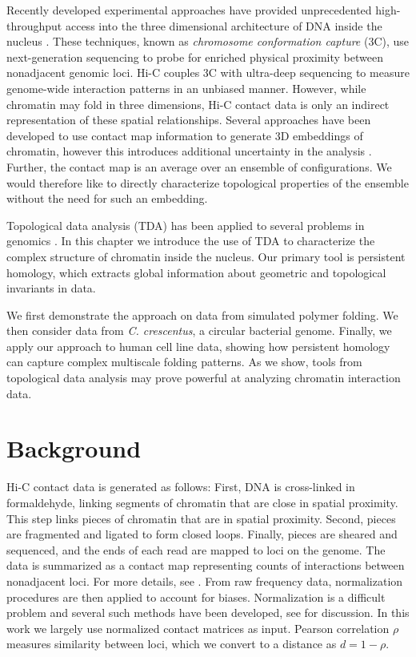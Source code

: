 Recently developed experimental approaches have provided unprecedented high-throughput access into the three dimensional architecture of DNA inside the nucleus \cite{LiebermanAiden:2009jz,Dekker:2013hi,Ay:2015gv}.
These techniques, known as \emph{chromosome conformation capture} (3C), use next-generation sequencing to probe for enriched physical proximity between nonadjacent genomic loci.
Hi-C couples 3C with ultra-deep sequencing to measure genome-wide interaction patterns in an unbiased manner.
However, while chromatin may fold in three dimensions, Hi-C contact data is only an indirect representation of these spatial relationships.
Several approaches have been developed to use contact map information to generate 3D embeddings of chromatin, however this introduces additional uncertainty in the analysis \cite{Ay:2015gv}.
Further, the contact map is an average over an ensemble of configurations.
We would therefore like to directly characterize topological properties of the ensemble without the need for such an embedding.

Topological data analysis (TDA) has been applied to several problems in genomics \cite{Chan:2013,Emmett:2014a}.
In this chapter we introduce the use of TDA to characterize the complex structure of chromatin inside the nucleus.
Our primary tool is persistent homology, which extracts global information about geometric and topological invariants in data.

We first demonstrate the approach on data from simulated polymer folding.
We then consider data from \emph{C. crescentus}, a circular bacterial genome.
Finally, we apply our approach to human cell line data, showing how persistent homology can capture complex multiscale folding patterns.
As we show, tools from topological data analysis may prove powerful at analyzing chromatin interaction data.

\section{Background}
\label{chromatin:sec:background}
%
Hi-C contact data is generated as follows:
First, DNA is cross-linked in formaldehyde, linking segments of chromatin that are close in spatial proximity.
This step links pieces of chromatin that are in spatial proximity.
Second, pieces are fragmented and ligated to form closed loops.
Finally, pieces are sheared and sequenced, and the ends of each read are mapped to loci on the genome.
The data is summarized as a contact map representing counts of interactions between nonadjacent loci.
For more details, see \cite{Dekker:2013hi}.
From raw frequency data, normalization procedures are then applied to account for biases.
Normalization is a difficult problem and several such methods have been developed, see \cite{Ay:2015gv} for discussion.
In this work we largely use normalized contact matrices as input.
Pearson correlation $\rho$ measures similarity between loci, which we convert to a distance as $d=1-\rho$.

